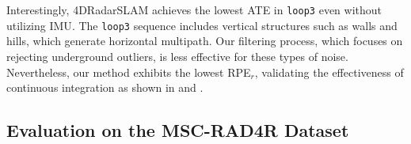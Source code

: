 Interestingly, 4DRadarSLAM achieves the lowest \ac{ATE} in \texttt{loop3} even without utilizing \ac{IMU}. The \texttt{loop3} sequence includes vertical structures such as walls and hills, which generate horizontal multipath.
Our filtering process, which focuses on rejecting underground outliers, is less effective for these types of noise.
Nevertheless, our method exhibits the lowest RPE$_r$, validating the effectiveness of continuous integration as shown in  and .






\subsection{Evaluation on the MSC-RAD4R Dataset}
\label{subsec:msc}

